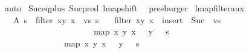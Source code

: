 \begin{isabellebody}
%
\isadelimproof
%
\endisadelimproof
%
\isatagproof
{}\isamarkupfalse%
\ auto\isanewline
{}\isamarkupfalse%
\ Suc{\isacharunderscore}{\kern0pt}eq{\isacharunderscore}{\kern0pt}plus{}\ Suc{\isacharunderscore}{\kern0pt}pred\ lmap{\isacharunderscore}{\kern0pt}shift\ \isamarkupfalse%
\ presburger%
\endisatagproof
{\isafoldproof}%
%
\isadelimproof
\isanewline
%
\endisadelimproof
\isanewline
\isanewline
{}\isamarkupfalse%
\ lmap{\isacharunderscore}{\kern0pt}filter{\isacharunderscore}{\kern0pt}aux{}{\isacharcolon}{\kern0pt}\isanewline
\ \ \ A{}{\isacharcolon}{\kern0pt}\ {\isachardoublequoteopen}s{}\ {\isacharequal}{\kern0pt}\ filter\ {\isacharparenleft}{\kern0pt}{\isasymlambda}{\isacharparenleft}{\kern0pt}x{\isacharcomma}{\kern0pt}y{\isacharparenright}{\kern0pt}{\isachardot}{\kern0pt}\ x\ {\isasymin}\ vs{\isacharparenright}{\kern0pt}\ s{\isachardoublequoteclose}\isanewline
\ \ \ {\isachardoublequoteopen}filter\ {\isacharparenleft}{\kern0pt}{\isasymlambda}{\isacharparenleft}{\kern0pt}x{\isacharcomma}{\kern0pt}y{\isacharparenright}{\kern0pt}{\isachardot}{\kern0pt}\ x\ {\isasymin}\ insert\ {}\ {\isacharparenleft}{\kern0pt}Suc\ {\isacharbackquote}{\kern0pt}\ vs{\isacharparenright}{\kern0pt}{\isacharparenright}{\kern0pt}\isanewline
\ \ \ \ \ \ \ \ \ \ \ \ \ \ \ \ \ \ \ {\isacharparenleft}{\kern0pt}{\isacharparenleft}{\kern0pt}{}{\isacharcomma}{\kern0pt}\ {}{\isacharparenright}{\kern0pt}\ {\isacharhash}{\kern0pt}\ map\ {\isacharparenleft}{\kern0pt}{\isasymlambda}{\isacharparenleft}{\kern0pt}x{\isacharcomma}{\kern0pt}\ y{\isacharparenright}{\kern0pt}{\isachardot}{\kern0pt}\ {\isacharparenleft}{\kern0pt}x\ {\isacharplus}{\kern0pt}\ {}{\isacharcomma}{\kern0pt}\ y\ {\isacharplus}{\kern0pt}\ {}{\isacharparenright}{\kern0pt}{\isacharparenright}{\kern0pt}\ s{\isacharparenright}{\kern0pt}\ {\isacharequal}{\kern0pt}\isanewline
\ \ \ \ \ \ \ \ \ \ \ \ {\isacharparenleft}{\kern0pt}{}{\isacharcomma}{\kern0pt}\ {}{\isacharparenright}{\kern0pt}\ {\isacharhash}{\kern0pt}\ map\ {\isacharparenleft}{\kern0pt}{\isasymlambda}{\isacharparenleft}{\kern0pt}x{\isacharcomma}{\kern0pt}\ y{\isacharparenright}{\kern0pt}{\isachardot}{\kern0pt}\ {\isacharparenleft}{\kern0pt}x\ {\isacharplus}{\kern0pt}\ {}{\isacharcomma}{\kern0pt}\ y\ {\isacharplus}{\kern0pt}\ {}{\isacharparenright}{\kern0pt}{\isacharparenright}{\kern0pt}\ s{}{\isachardoublequoteclose}\isanewline

\end{isabellebody}
